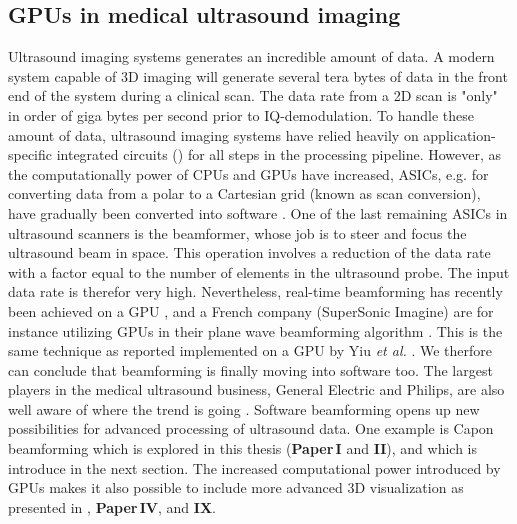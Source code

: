 
\subsection{GPUs in medical ultrasound imaging}
Ultrasound imaging systems generates an incredible amount of data. A modern system capable of 3D imaging will generate several tera bytes of data in the front end of the system during a clinical scan. The data rate from a 2D scan is "only" in order of giga bytes per second prior to IQ-demodulation. To handle these amount of data, ultrasound imaging systems have relied heavily on application-specific integrated circuits () for all steps in the processing pipeline. However, as the computationally power of CPUs and GPUs have increased, ASICs, e.g. for converting data from a polar to a Cartesian grid (known as scan conversion), have gradually been converted into software \cite{Guracar2013}. One of  the last remaining ASICs in ultrasound scanners is the beamformer, whose job is to steer and focus the ultrasound beam in space. This operation involves a reduction of the data rate with a factor equal to the number of elements in the ultrasound probe. The input data rate is therefor very high. Nevertheless, real-time beamforming has recently been achieved on a GPU \cite{Song2012}, and a French company (SuperSonic Imagine) are for instance utilizing GPUs in their plane wave beamforming algorithm \cite{Tanter2014}. This is the same technique as reported implemented on a GPU by Yiu \textit{et al.} \cite{Yiu2011}. We therfore can conclude that beamforming is finally moving into software too. The largest players in the medical ultrasound business, General Electric and Philips, are also well aware of where the trend is going \cite{Thomenius2012} \cite{Metz2011}. Software beamforming opens up new possibilities for advanced processing of ultrasound data. One example is Capon beamforming which is explored in this thesis (\textbf{Paper\,I} and \textbf{II}), and which is introduce in the next section. The increased computational power introduced by GPUs makes it also possible to include more advanced 3D visualization as presented in \cite{solteszova2010multidirectional}, \textbf{Paper\,IV}, and \textbf{IX}.

